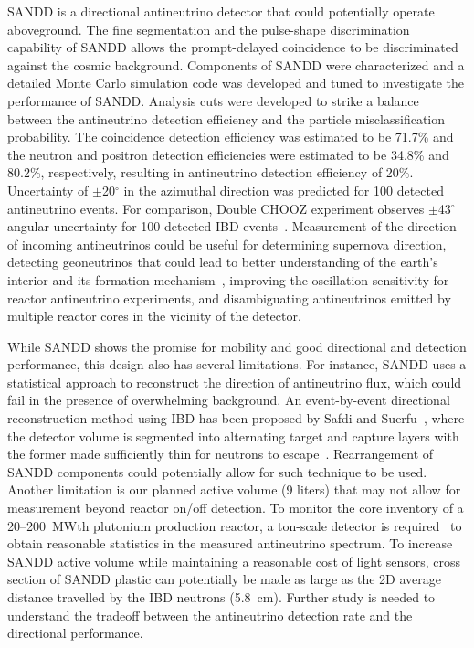 \documentclass[final,5p,times,twocolumn]{elsarticle}
\begin{document}
SANDD is a directional antineutrino detector that could potentially operate aboveground. The fine segmentation and the pulse-shape discrimination capability of SANDD allows the prompt-delayed coincidence to be discriminated against the cosmic background.
Components of SANDD were characterized and a detailed Monte Carlo simulation code was developed and tuned to investigate the performance of SANDD. 
Analysis cuts were developed to strike a balance between the antineutrino detection efficiency and the particle misclassification probability. 
The coincidence detection efficiency was estimated to be 71.7\% and the neutron and positron detection efficiencies were estimated to be 34.8\% and 80.2\%, respectively, resulting in antineutrino detection efficiency of 20\%. 
Uncertainty of $\pm$20$^\circ$ in the azimuthal direction was predicted for 100 detected antineutrino events. For comparison, Double CHOOZ experiment observes $\pm$43$^\circ$ angular uncertainty for 100 detected IBD events~\cite{caden_hawaii}.%
Measurement of the direction of incoming antineutrinos could be useful for determining supernova direction, detecting geoneutrinos that could lead to better understanding of the earth's interior and its formation mechanism~\cite{tanakaWatanabe}, improving the oscillation sensitivity for reactor antineutrino experiments, and disambiguating antineutrinos emitted by multiple reactor cores in the vicinity of the detector.

While SANDD shows the promise for mobility and good directional and detection performance, this design also has several limitations.
For instance, SANDD uses a statistical approach to reconstruct the direction of antineutrino flux, which could fail in the presence of overwhelming background. %
An event-by-event directional reconstruction method using IBD has been proposed by Safdi and Suerfu~\cite{safdi2015}, where the detector volume is segmented into alternating target and capture layers with the former made sufficiently thin for neutrons to escape~\cite{safdi2015}.
Rearrangement of SANDD components could potentially allow for such technique to be used.
Another limitation is our planned active volume (9 liters) that may not allow for measurement beyond reactor on/off detection.
To monitor the core inventory of a 20--200~MWth plutonium production reactor, a ton-scale detector is required~\cite{Christensen2014,Christensen2015} to obtain reasonable statistics in the measured antineutrino spectrum.
To increase SANDD active volume while maintaining a reasonable cost of light sensors, cross section of SANDD plastic can potentially be made as large as the 2D average distance travelled by the IBD neutrons (5.8~cm). 
Further study is needed to understand the tradeoff between the antineutrino detection rate and the directional performance.
\end{document}
